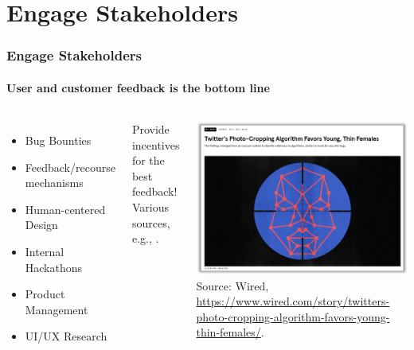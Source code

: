 \documentclass[11pt,
               aspectratio=169,
               hyperref={colorlinks}
               ]{beamer}
\begin{document}
	\section{Engage Stakeholders}

		\begin{frame}
			
			\frametitle{Engage Stakeholders}
			\framesubtitle{User and customer feedback is the bottom line}
			
			\begin{columns}
				\vspace{-5pt}
				\begin{itemize}
					\item Bug Bounties
					\item Feedback/recourse mechanisms
					\item Human-centered Design
					\item Internal Hackathons
					\item Product Management
					\item UI/UX Research
				\end{itemize}
				\noindent Provide incentives for the best feedback!\\
				\vspace{5pt}
				\scriptsize{Various sources, e.g., \cite{schwartz2022towards}.}

				
				
				\centering
				\newline
				\includegraphics[width=\textwidth]{../img/engage.png} 
				\newline
				\tiny{Source: Wired, \url{https://www.wired.com/story/twitters-photo-cropping-algorithm-favors-young-thin-females/}.}
			\end{columns}
					
		\end{frame}
\end{document}
